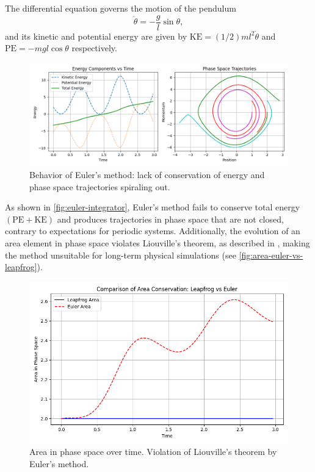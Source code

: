The differential equation governs the motion of the pendulum
\begin{equation*}
    \ddot{\theta} = -\frac{g}{l}\sin\theta,
\end{equation*}
and its kinetic and potential energy are given by $\textrm{KE} = (1/2)ml^2\dot{\theta}$ and $\textrm{PE} = -mgl\cos\theta$ respectively.
\begin{figure}[htp]
    \centering
    \includegraphics[scale=0.6]{chapters/time-integration/img/euler-pendulum.png}
    \caption{Behavior of Euler's method: lack of conservation of energy and phase space trajectories spiraling out.}
    \label{fig:euler-integrator}
\end{figure}
As shown in \autoref{fig:euler-integrator}, Euler's method fails to conserve total energy $(\textrm{PE} + \textrm{KE})$ and produces trajectories in phase space that are not closed, contrary to expectations for periodic systems.
Additionally, the evolution of an area element in phase space violates Liouville's theorem, as described in \cite{taylor2005classical}, making the method unsuitable for long-term physical simulations (see \autoref{fig:area-euler-vs-leapfrog}).
\begin{figure}[htp]
    \centering
    \includegraphics[scale=0.4]{chapters/time-integration/img/area-leap-vs-euler.png}
    \caption{Area in phase space over time. Violation of Liouville's theorem by Euler's method.}
    \label{fig:area-euler-vs-leapfrog}
\end{figure}